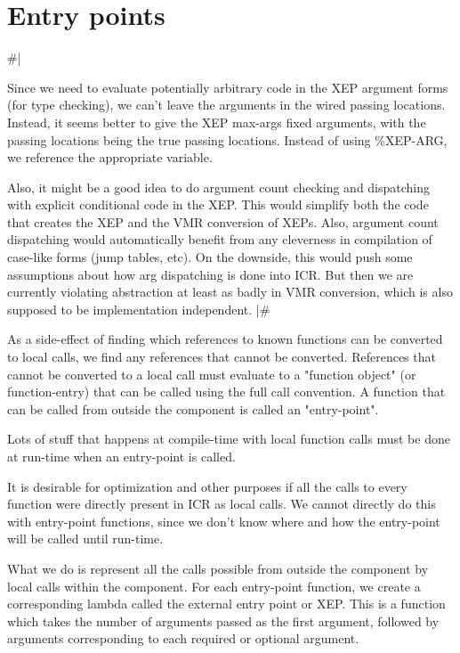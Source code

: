 
\section{Entry points}

\#|

Since we need to evaluate potentially arbitrary code in the XEP argument forms
(for type checking), we can't leave the arguments in the wired passing
locations.  Instead, it seems better to give the XEP max-args fixed arguments,
with the passing locations being the true passing locations.  Instead of using
\%XEP-ARG, we reference the appropriate variable.

Also, it might be a good idea to do argument count checking and dispatching
with explicit conditional code in the XEP.  This would simplify both the code
that creates the XEP and the VMR conversion of XEPs.  Also, argument count
dispatching would automatically benefit from any cleverness in compilation of
case-like forms (jump tables, etc).  On the downside, this would push some
assumptions about how arg dispatching is done into ICR.  But then we are
currently violating abstraction at least as badly in VMR conversion, which is
also supposed to be implementation independent.
|\#

As a side-effect of finding which references to known functions can be
converted to local calls, we find any references that cannot be converted.
References that cannot be converted to a local call must evaluate to a
"function object" (or function-entry) that can be called using the full call
convention.  A function that can be called from outside the component is called
an "entry-point".

Lots of stuff that happens at compile-time with local function calls must be
done at run-time when an entry-point is called.

It is desirable for optimization and other purposes if all the calls to every
function were directly present in ICR as local calls.  We cannot directly do
this with entry-point functions, since we don't know where and how the
entry-point will be called until run-time.

What we do is represent all the calls possible from outside the component by
local calls within the component.  For each entry-point function, we create a
corresponding lambda called the external entry point or XEP.  This is a
function which takes the number of arguments passed as the first argument,
followed by arguments corresponding to each required or optional argument.

